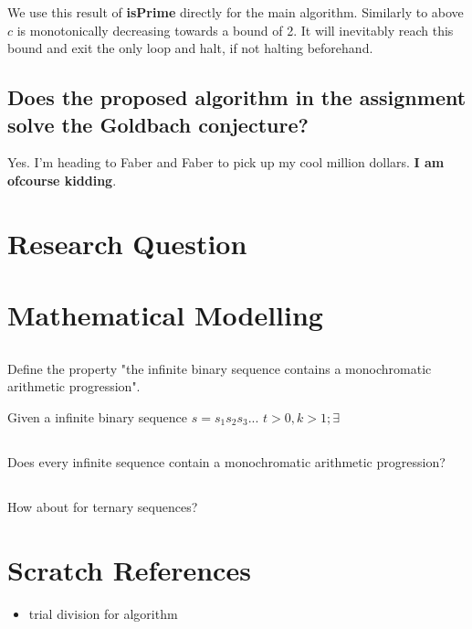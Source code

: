 \documentclass{article}
\begin{document}
We use this result of \textbf{isPrime} directly for the main algorithm. Similarly to above $c$ is monotonically decreasing towards a bound of 2. It will inevitably reach this bound and exit the only loop and halt, if not halting beforehand.

\subsection{Does the proposed algorithm in the assignment solve the Goldbach conjecture?}
Yes. I'm heading to Faber and Faber to pick up my cool million dollars. \textbf{I am ofcourse kidding}.



\section{Research Question}
\section{Mathematical Modelling}
\subsection{}
Define the property "the infinite binary sequence contains a monochromatic arithmetic progression".

Given a infinite binary sequence $s = s_{1}s_{2}s_{3}...$
\begin{math}
	t>0,k>1; \exists
\end{math}

\subsection{}
Does every infinite sequence contain a monochromatic arithmetic progression?

\subsection{} How about for ternary sequences?

\section{Scratch References}
\begin{itemize}
	\item trial division for algorithm
\end{itemize}
\end{document}
